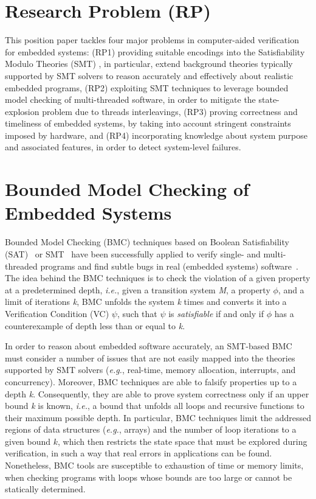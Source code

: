 \documentclass{acm_sen_article}
\begin{document}
\section{Research Problem (RP)}

This position paper tackles four major problems in computer-aided verification for embedded systems: (RP1) providing suitable encodings into the Satisfiability Modulo Theories (SMT) \cite{BarrettSST09}, in particular, extend background theories typically supported by SMT solvers to reason accurately and effectively about realistic embedded programs, (RP2) exploiting SMT techniques to leverage bounded model checking of multi-threaded software, in order to mitigate the state-explosion problem due to threads interleavings, (RP3) proving correctness and timeliness of embedded systems, by taking into account stringent constraints imposed by hardware, and (RP4) incorporating knowledge about system purpose and associated features, in order to detect system-level failures.

\section{Bounded Model Checking of Embedded Systems}

Bounded Model Checking (BMC) techniques based on Boolean Satisfiability (SAT)~\cite{handbook09} or SMT~\cite{BarrettSST09} have been successfully applied to verify single- and multi-threaded programs and find subtle bugs in real (embedded systems) software~\cite{Clarke04,MerzFS12,CordeiroF11,Ivancic05,Cordeiro12}. The idea behind the BMC techniques is to check the violation of a given property at a predetermined depth, {\it i.e.}, given a transition system \textit{M}, a property $ \phi $, and a limit of iterations \textit{k}, BMC unfolds the system \textit{k} times and converts it into a Verification Condition (VC) $ \psi $, such that $\psi$ is \textit{satisfiable} if and only if $\phi$ has a counterexample of depth
less than or equal to \textit{k}.

In order to reason about embedded software accurately, an SMT-based BMC must consider a number of issues that are not easily mapped into the theories supported by SMT solvers ({\it e.g.}, real-time, memory allocation, interrupts, and concurrency). Moreover, BMC techniques are able to falsify properties up to a depth \textit{k}. Consequently, they are able to prove system correctness only if an upper bound \textit{k} is known, {\it i.e.}, a bound that unfolds all loops and recursive functions to their maximum possible depth. In particular, BMC techniques limit the addressed regions of data structures ({\it e.g.}, arrays) and the number of loop iterations to a given bound $k$, which then restricts the state space that must be explored during verification, in such a way that real errors in applications \cite{Clarke04,MerzFS12,Ivancic05,Cordeiro12} can be found. Nonetheless, BMC tools are susceptible to exhaustion of time or memory limits, when checking programs with loops whose bounds are too large or cannot be statically determined.  
\end{document}
